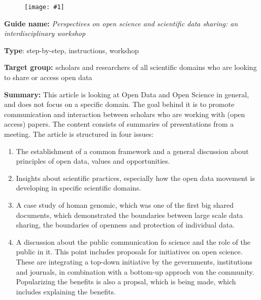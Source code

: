 \documentclass{article}
\newlength{\imgwidth}
\newcommand\scaledgraphics[2]{%
                
\settowidth{\imgwidth}{\texttt{[image: \#1]}}%
                
\setlength{\imgwidth}{\minof{\imgwidth}{#2\textwidth}}%
                
\texttt{[image: \#1]}%
                
}
\begin{document}
\begin{center}
\begin{figure}
\scaledgraphics{6ab89e0c-e542-4afd-b586-eabe59773bc0.jpg}{0.5}
\label{F43484161}
\end{figure}


\end{center}


\textbf{Guide name:}  \emph{Perspectives on open science and scientific data sharing: an interdisciplinary workshop} \autocite{destro_bisol_perspectives_2014}


\textbf{Type}: step-by-step, instructions, workshop


\textbf{Target group:} scholars and researchers of all scientific domains who are looking to share or access open data


\textbf{Summary:} This article is looking at Open Data and Open Science in general, and does not focus on a specific domain. The goal behind it is to promote communication and interaction between scholars who are working with (open access) papers. The content consists of summaries of presentations from a meeting. The article is structured in four issues:

\begin{enumerate}
\item The establishment of a common framework and a general discussion about principles of open data, values and opportunities.


\item Insights about scientific practices, especially how the open data movement is developing in specific scientific domains.


\item A case study of homan genomic, which was one of the first big shared documents, which demonstrated the boundaries between large scale data sharing, the boundaries of openness and protection of individual data.


\item A discussion about the public communication fo science and the role of the public in it. This point includes proposals for initiatives on open science. These are integrating a top-down initiative by the gevernments, institutions and journals, in combination with a bottom-up approch von the community. Popularizing the benefits is also a propsal, which is being made, which includes explaining the benefits.


\end{enumerate}
\end{document}

